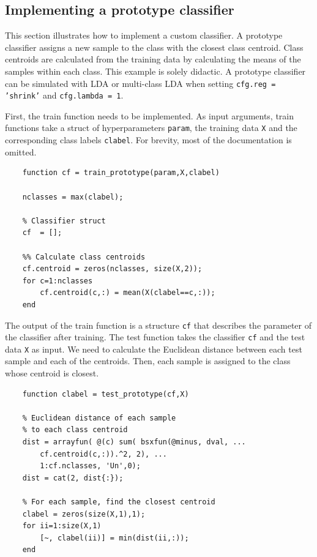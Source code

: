 \documentclass[utf8]{frontiersSCNS} %
\newcommand{\ttt}[1]{\texttt{#1}}
\begin{document}
\subsection{Implementing a prototype classifier}

This section illustrates how to implement a custom classifier. A prototype classifier assigns a new sample to the class with the closest class centroid. Class centroids are calculated from the training data by calculating the means of the samples within each class. This example is solely didactic. A prototype classifier can be simulated with LDA or multi-class LDA when setting \ttt{cfg.reg = 'shrink'} and \ttt{cfg.lambda = 1}.

First, the train function needs to be implemented. As input arguments, train functions  take a  struct of hyperparameters \ttt{param},  the training data \ttt{X} and the corresponding  class labels \ttt{clabel}. For brevity, most of the documentation is omitted.

\begin{verbatim}
    function cf = train_prototype(param,X,clabel)

    nclasses = max(clabel);

    % Classifier struct
    cf  = [];

    %% Calculate class centroids
    cf.centroid = zeros(nclasses, size(X,2));
    for c=1:nclasses
        cf.centroid(c,:) = mean(X(clabel==c,:));
    end
\end{verbatim}

The output of the train function is a structure \ttt{cf} that describes the parameter of the classifier after training. The test function takes the classifier \ttt{cf} and the test data \ttt{X} as input. We need to calculate the Euclidean distance between each test sample and each of the centroids. Then, each sample is assigned to the class whose centroid is closest.

\begin{verbatim}
    function clabel = test_prototype(cf,X)

    % Euclidean distance of each sample 
    % to each class centroid
    dist = arrayfun( @(c) sum( bsxfun(@minus, dval, ...
        cf.centroid(c,:)).^2, 2), ...
        1:cf.nclasses, 'Un',0);
    dist = cat(2, dist{:});

    % For each sample, find the closest centroid
    clabel = zeros(size(X,1),1);
    for ii=1:size(X,1)
        [~, clabel(ii)] = min(dist(ii,:));
    end

\end{verbatim}
\end{document}
